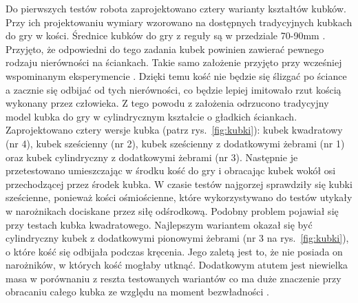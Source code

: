 Do pierwszych testów robota zaprojektowano cztery warianty kształtów kubków. Przy ich projektowaniu wymiary wzorowano na dostępnych tradycyjnych kubkach do gry w kości.
Średnice kubków do gry z reguły są w przedziale 70-90mm \cite{cup}. Przyjęto, że odpowiedni do tego zadania kubek powinien
zawierać pewnego rodzaju nierówności na ściankach. Takie samo założenie przyjęto przy wcześniej wspominanym eksperymencie \cite{PK}. Dzięki temu kość nie będzie się ślizgać po ściance a zacznie się odbijać od tych nierówności, co 
będzie lepiej imitowało rzut kością wykonany przez człowieka. Z tego powodu z założenia odrzucono tradycyjny model kubka do gry w cylindrycznym kształcie 
o gładkich ściankach. Zaprojektowano cztery wersje kubka (patrz rys.~\ref{fig:kubki}): kubek kwadratowy (nr 4), kubek sześcienny (nr 2), kubek sześcienny z dodatkowymi żebrami (nr 1)
oraz kubek cylindryczny z dodatkowymi żebrami (nr 3). 
Następnie je przetestowano umieszczając w środku kość do gry i obracając kubek wokół osi przechodzącej przez środek kubka. W czasie testów najgorzej sprawdziły się kubki sześcienne,
ponieważ kości ośmiościenne, które wykorzystywano do testów utykały w narożnikach dociskane przez siłę odśrodkową. Podobny problem pojawiał się przy testach kubka kwadratowego.
Najlepszym wariantem okazał się być cylindryczny kubek z dodatkowymi pionowymi żebrami (nr 3 na rys.~\ref{fig:kubki}), o które kość się odbijała podczas kręcenia.
Jego zaletą jest to, że nie posiada on narożników, w których kość mogłaby utknąć. Dodatkowym atutem jest niewielka masa w porównaniu z reszta testowanych wariantów co ma duże znaczenie 
przy obracaniu całego kubka ze względu na moment bezwładności \cite{bezwladnosc}.

